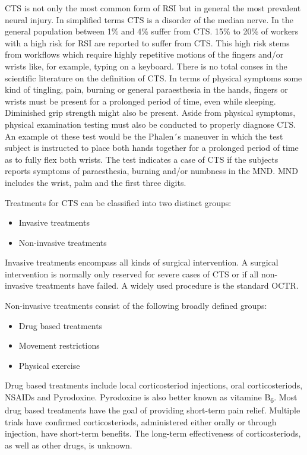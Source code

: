 \gls{CTS} is not only the most common form of \gls{RSI} but in general the most prevalent neural injury\cite{ballestero2017effectiveness}.
In simplified terms \gls{CTS} is a disorder of the median nerve.
In the general population between 1\% and 4\% suffer from \gls{CTS}\cite{bongers2007carpal}.
15\% to 20\% of workers with a high risk for \gls{RSI} are reported to suffer from \gls{CTS}.
This high risk stems from workflows which require highly repetitive motions of the fingers and/or wrists like, for example, typing on a keyboard.
There is no total conses in the scientific literature on the definition of \gls{CTS}\cite{descatha2011comparison}.
In terms of physical symptoms some kind of tingling, pain, burning or general paraesthesia in the hands, fingers or wrists must be present for a prolonged period of time, even while sleeping.
Diminished grip strength might also be present.
Aside from physical symptoms, physical examination testing must also be conducted to properly diagnose \gls{CTS}.
An example ot these test would be the Phalen´s maneuver in which the test subject is instructed to place both hands together for a prolonged period of time as to fully flex both wrists.
The test indicates a case of \gls{CTS} if the subjects reports symptoms of paraesthesia, burning and/or numbness in the \gls{MND}.
\gls{MND} includes the wrist, palm and the first three digits.

Treatments for \gls{CTS} can be classified into two distinct groups:
\begin{itemize}
	\item Invasive treatments
	\item Non-invasive treatments
\end{itemize}
Invasive treatments encompass all kinds of surgical intervention.
A surgical intervention is normally only reserved for severe cases of \gls{CTS} or if all non-invasive treatments have failed.
A widely used procedure is the standard \gls{OCTR}.

Non-invasive treatments consist of the following broadly defined groups:
\begin{itemize}
	\item Drug based treatments
	\item Movement restrictions
	\item Physical exercise
\end{itemize}

Drug based treatments include local corticosteriod injections, oral corticosteriods, \gls{NSAIDs} and Pyrodoxine.
Pyrodoxine is also better known as vitamine B\textsubscript{6}.
Most drug based treatments have the goal of providing short-term pain relief.
Multiple trials have confirmed corticosteriods, administered either orally or through injection, have short-term benefits\cite{van2007repetitive}.
The long-term effectiveness of corticosteriods, as well as other drugs, is unknown.


